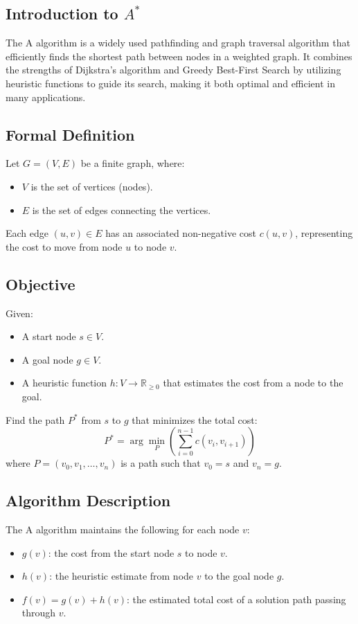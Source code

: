 \documentclass[12pt]{article}
\begin{document}
\subsection{Introduction to $A^*$}
The A\* algorithm is a widely used pathfinding and graph traversal algorithm that efficiently finds the shortest path between nodes in a weighted graph. It combines the strengths of Dijkstra's algorithm and Greedy Best-First Search by utilizing heuristic functions to guide its search, making it both optimal and efficient in many applications.

\subsection{Formal Definition}
Let \( G = (V, E) \) be a finite graph, where:

\begin{itemize}
    \item \( V \) is the set of vertices (nodes).
    \item \( E \) is the set of edges connecting the vertices.
\end{itemize}

\noindent Each edge \( (u, v) \in E \) has an associated non-negative cost \( c(u, v) \), representing the cost to move from node \( u \) to node \( v \).

\subsection{Objective}
Given:
\begin{itemize}
    \item A start node \( s \in V \).
    \item A goal node \( g \in V \).
    \item A heuristic function \( h: V \rightarrow \mathbb{R}_{\geq 0} \) that estimates the cost from a node to the goal.
\end{itemize}

\noindent Find the path \( P^* \) from \( s \) to \( g \) that minimizes the total cost:
\[
P^* = \arg\min_{P} \left( \sum_{i=0}^{n-1} c(v_i, v_{i+1}) \right)
\]
\noindent where \( P = (v_0, v_1, \dots, v_n) \) is a path such that \( v_0 = s \) and \( v_n = g \).

\subsection{Algorithm Description}
The A\* algorithm maintains the following for each node \( v \):
\begin{itemize}
    \item \( g(v) \): the cost from the start node \( s \) to node \( v \).
    \item \( h(v) \): the heuristic estimate from node \( v \) to the goal node \( g \).
    \item \( f(v) = g(v) + h(v) \): the estimated total cost of a solution path passing through \( v \).
\end{itemize}
\end{document}
